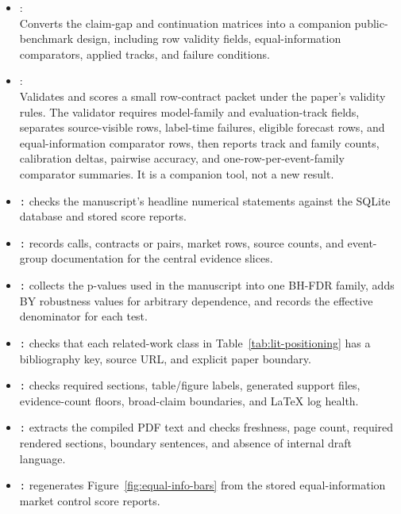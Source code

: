 \documentclass[11pt]{article}
\begin{document}
\begin{itemize}[leftmargin=*]
\item \texttt{}:\\
Converts the claim-gap and continuation matrices into a companion public-benchmark design, including row validity fields, equal-information comparators, applied tracks, and failure conditions.
\item {\footnotesize{}}:\\
Validates and scores a small row-contract packet under the paper's validity rules. The validator requires model-family and evaluation-track fields, separates source-visible rows, label-time failures, eligible forecast rows, and equal-information comparator rows, then reports track and family counts, calibration deltas, pairwise accuracy, and one-row-per-event-family comparator summaries. It is a companion tool, not a new result.
\item \texttt{:} checks the manuscript's headline numerical statements against the SQLite database and stored score reports.
\item \texttt{:} records calls, contracts or pairs, market rows, source counts, and event-group documentation for the central evidence slices.
\item \texttt{:} collects the p-values used in the manuscript into one BH-FDR family, adds BY robustness values for arbitrary dependence, and records the effective denominator for each test.
\item \texttt{:} checks that each related-work class in Table~\ref{tab:lit-positioning} has a bibliography key, source URL, and explicit paper boundary.
\item \texttt{:} checks required sections, table/figure labels, generated support files, evidence-count floors, broad-claim boundaries, and LaTeX log health.
\item \texttt{:} extracts the compiled PDF text and checks freshness, page count, required rendered sections, boundary sentences, and absence of internal draft language.
\item \texttt{:} regenerates Figure~\ref{fig:equal-info-bars} from the stored equal-information market control score reports.
\end{itemize}
\end{document}
